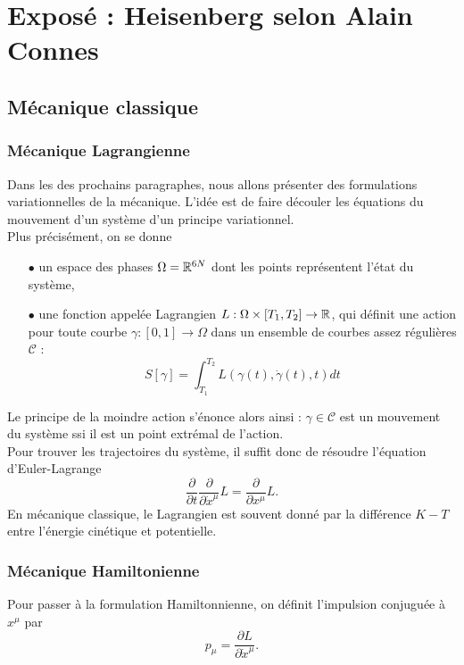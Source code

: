 \section{Exposé : Heisenberg selon Alain Connes}

\subsection{Mécanique classique}

\subsubsection{Mécanique Lagrangienne}

Dans les des prochains paragraphes, nous allons présenter des formulations variationnelles de la mécanique. L'idée est de faire découler les équations du mouvement d'un système d'un principe variationnel. \\

Plus précisément, on se donne 
\begin{itemize}
\item[$\bullet$] un espace des phases $\Omega=\mathbb R^{6N}$ dont les points représentent l'état du système,
\item[$\bullet$] une fonction appelée Lagrangien $L : \Omega\times [T_1,T_2]\rightarrow \mathbb R$, qui définit une action pour toute courbe $\gamma :[0,1]\rightarrow \Omega$ dans un ensemble de courbes assez régulières $\mathcal C$ :
\[S[\gamma]=\int_{T_1}^{T_2} L(\gamma(t),\dot{\gamma}(t),t) dt \]
\end{itemize}

Le principe de la moindre action s'énonce alors ainsi : $\gamma\in \mathcal C$ est un mouvement du système ssi il est un point extrémal de l'action. \\

Pour trouver les trajectoires du système, il suffit donc de résoudre l'équation d'Euler-Lagrange
\[\frac{\partial}{\partial t}\frac{\partial}{\partial \dot{x}^\mu}L=\frac{\partial}{\partial x^\mu}L.\]
En mécanique classique, le Lagrangien est souvent donné par la différence $K-T$ entre l'énergie cinétique et potentielle.
\subsubsection{Mécanique Hamiltonienne}
Pour passer à la formulation Hamiltonnienne, on définit l'impulsion conjuguée à $x^\mu$ par 
\[p_\mu = \frac{\partial L}{\partial \dot{x}^\mu}.\]

